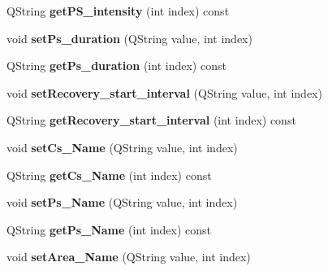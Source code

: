 \begin{DoxyCompactItemize}
\item 
Q\+String {\bfseries get\+P\+S\+\_\+intensity} (int index) const \hypertarget{class_tuningtraffic_a6846d12be51431c116cad82214140321}{}\label{class_tuningtraffic_a6846d12be51431c116cad82214140321}

\item 
void {\bfseries set\+Ps\+\_\+duration} (Q\+String value, int index)\hypertarget{class_tuningtraffic_a6a8051c4a1c4ba19b8e80f4b4a8ebced}{}\label{class_tuningtraffic_a6a8051c4a1c4ba19b8e80f4b4a8ebced}

\item 
Q\+String {\bfseries get\+Ps\+\_\+duration} (int index) const \hypertarget{class_tuningtraffic_a063e589d7916ff768572cafb224d059d}{}\label{class_tuningtraffic_a063e589d7916ff768572cafb224d059d}

\item 
void {\bfseries set\+Recovery\+\_\+start\+\_\+interval} (Q\+String value, int index)\hypertarget{class_tuningtraffic_ad690e7667d193f8e4ad30d4a95736cc2}{}\label{class_tuningtraffic_ad690e7667d193f8e4ad30d4a95736cc2}

\item 
Q\+String {\bfseries get\+Recovery\+\_\+start\+\_\+interval} (int index) const \hypertarget{class_tuningtraffic_a9c0461b623899943a4d83531631da2f9}{}\label{class_tuningtraffic_a9c0461b623899943a4d83531631da2f9}

\item 
void {\bfseries set\+Cs\+\_\+\+Name} (Q\+String value, int index)\hypertarget{class_tuningtraffic_a86ac8b313da47ba4df59a18edcf8dc13}{}\label{class_tuningtraffic_a86ac8b313da47ba4df59a18edcf8dc13}

\item 
Q\+String {\bfseries get\+Cs\+\_\+\+Name} (int index) const \hypertarget{class_tuningtraffic_abe35ee9f081c1344e843c5d23a9cedec}{}\label{class_tuningtraffic_abe35ee9f081c1344e843c5d23a9cedec}

\item 
void {\bfseries set\+Ps\+\_\+\+Name} (Q\+String value, int index)\hypertarget{class_tuningtraffic_a65483c713b77f6fc375608fd4c38cbfb}{}\label{class_tuningtraffic_a65483c713b77f6fc375608fd4c38cbfb}

\item 
Q\+String {\bfseries get\+Ps\+\_\+\+Name} (int index) const \hypertarget{class_tuningtraffic_ad7c0ad5e9b0a88015e211b6ab5c9e9a5}{}\label{class_tuningtraffic_ad7c0ad5e9b0a88015e211b6ab5c9e9a5}

\item 
void {\bfseries set\+Area\+\_\+\+Name} (Q\+String value, int index)\hypertarget{class_tuningtraffic_a45d192ff0eff862201ddc8d76d6c9de6}{}\label{class_tuningtraffic_a45d192ff0eff862201ddc8d76d6c9de6}


\end{DoxyCompactItemize}
